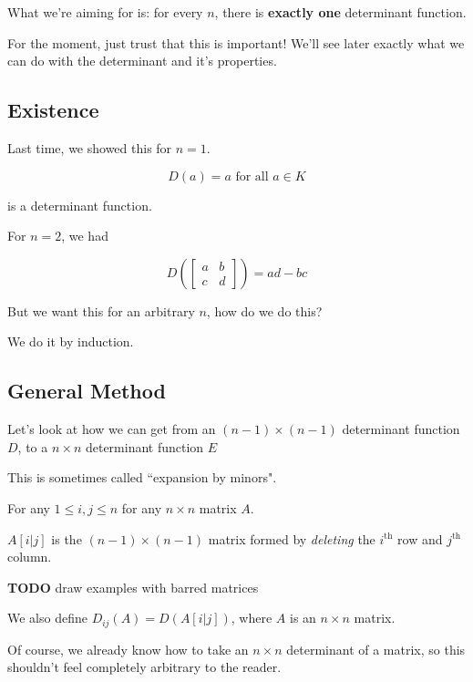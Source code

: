 \documentclass[12pt]{article}
\newcommand{\TODO}{\color{red}\textbf{TODO}\color{black}}
\begin{document}
  What we're aiming for is: for every $n$, there is {\bf exactly one}
  determinant function.

  For the moment, just trust that this is important! We'll see later exactly
  what we can do with the determinant and it's properties.

  \subsection{Existence}

  Last time, we showed this for $n = 1$.

  \[
    D(a) = a \text{ for all $a \in K$}
  \]

  is a determinant function.

  For $n = 2$, we had

  \[
    D\left(\begin{bmatrix} a & b \\ c & d \end{bmatrix}\right) = ad - bc
  \]

  But we want this for an arbitrary $n$, how do we do this?

  We do it by induction.

  \subsection{General Method}

  Let's look at how we can get from an $(n - 1) \times (n - 1)$ determinant
  function $D$, to a $n \times n$ determinant function $E$

  This is sometimes called ``expansion by minors".

  For any $1 \le i, j \le n$ for any $n \times n$ matrix $A$.

  $A[i | j]$ is the $(n - 1) \times (n - 1)$ matrix formed by {\it deleting}
  the $i^\text{th}$ row and $j^\text{th}$ column.

  \TODO{} draw examples with barred matrices

  We also define $D_{ij}(A) = D(A[i | j])$, where $A$ is an $n \times n$ matrix.


  Of course, we already know how to take an $n \times n$ determinant of a
  matrix, so this shouldn't feel completely arbitrary to the reader.
\end{document}
